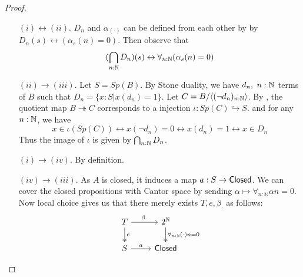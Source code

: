 \begin{proof}
\item 
  \begin{itemize}
  \item[$(i)\leftrightarrow (ii)$.] 
    $D_n$ and $\alpha_{(\cdot)}$ can be defined from each other by 
     by $D_n(s) \leftrightarrow (\alpha_s(n) = 0)$. Then observe that %
     \begin{equation}
      (\bigcap_{n:\mathbb{N}} D_n) (s) \leftrightarrow 
      \forall_{n:\mathbb N} (\alpha_s(n) = 0) 
     \end{equation}
   \item[$(ii) \to (iii)$.]
      Let $S=Sp(B)$. 
      By Stone duality, we have $d_n,~n:\mathbb{N}$ terms of $B$ such that $D_n = \{x:S| x(d_n) = 1\}$. 
      Let $C = B/\langle (\neg d_n)_{n:\mathbb{N}}\rangle$.
      By , the quotient map $B \twoheadrightarrow C$
      corresponds to a injection $\iota:Sp(C) \hookrightarrow  S$. 
      and for any $n:\mathbb{N}$, we have 
      \begin{equation}
        x\in \iota(Sp(C)) \leftrightarrow x(\neg d_n) = 0 \leftrightarrow x(d_n) = 1 \leftrightarrow x\in D_n
      \end{equation}
      Thus the image of $\iota$ is given by $\bigcap_{n:\mathbb{N}} D_n$. 
%
   \item [$(i) \to (iv)$.] By definition.
   \item[$(iv) \to (iii)$.]
     As $A$ is closed, it induces a map $a:S\to \mathsf{Closed}$. 
     We can cover the closed propositions with Cantor space
     by sending 
     $\alpha \mapsto \forall_{n:\mathbb N} \alpha n = 0.$
     Now local choice gives us that there merely exists $T, e, \beta_\cdot$ as follows:
     \begin{equation}
       \begin{tikzcd}
         T \arrow[r,"\beta_\cdot"] \arrow[d, two heads,"e"] & 2^\mathbb N 
         \arrow[d,two heads, "\forall_{n:\mathbb N} (\cdot)n = 0"] \\
         S \arrow[r,"a"] & \Closed
       \end{tikzcd} 

\end{equation}
\end{itemize}
\end{proof}
